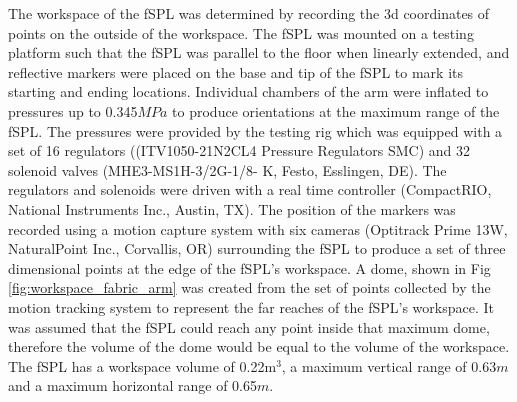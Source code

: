 \documentclass[letterpaper, 10 pt, conference]{ieeeconf}  %
\begin{document}
The workspace of the fSPL was determined by recording the 3d coordinates of points on the outside of the workspace. The fSPL was mounted on a testing platform such that the fSPL was parallel to the floor when linearly extended, and reflective markers were placed on the base and tip of the fSPL to mark its starting and ending locations. Individual chambers of the arm were inflated to pressures up to 0.345$MPa$ to produce orientations at the maximum range of the fSPL. The pressures were provided by the testing rig which was equipped with a set of 16 regulators ((ITV1050-21N2CL4 Pressure Regulators
SMC) and 32 solenoid valves (MHE3-MS1H-3/2G-1/8-
K, Festo, Esslingen, DE). The regulators and solenoids were driven with a real time controller (CompactRIO, National Instruments Inc., Austin, TX). The position of the markers was recorded using a motion capture system with six cameras (Optitrack Prime 13W, NaturalPoint Inc., Corvallis, OR) surrounding the fSPL to produce a set of three dimensional points at the edge of the fSPL's workspace. A dome, shown in Fig \ref{fig:workspace_fabric_arm} was created from the set of points collected by the motion tracking system to represent the far reaches of the fSPL's workspace. It was assumed that the fSPL could reach any point inside that maximum dome, therefore the volume of the dome would be equal to the volume of the workspace. The fSPL has a workspace volume of 0.22m$^{3}$, a maximum vertical range of 0.63$m$ and a maximum horizontal range of 0.65$m$. 









\end{document}
